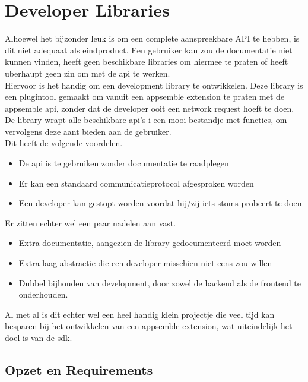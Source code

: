 \chapter{Developer Libraries}

Alhoewel het bijzonder leuk is om een complete aanspreekbare API te hebben, is dit niet adequaat als eindproduct. Een gebruiker kan zou de documentatie niet kunnen vinden, heeft geen beschikbare libraries om hiermee te praten of heeft uberhaupt geen zin om met de api te werken. \\

Hiervoor is het handig om een development library te ontwikkelen. Deze library is een plugintool gemaakt om vanuit een appsemble extension te praten met de appsemble api, zonder dat de developer ooit een network request hoeft te doen. De library wrapt alle beschikbare api's i een mooi bestandje met functies, om vervolgens deze aant bieden aan de gebruiker. \\ 

Dit heeft de volgende voordelen.

\begin{itemize}
	\item De api is te gebruiken zonder documentatie te raadplegen
	\item Er kan een standaard communicatieprotocol afgesproken worden
	\item Een developer kan gestopt worden voordat hij/zij iets stoms probeert te doen
\end{itemize}

Er zitten echter wel een paar nadelen aan vast.

\begin{itemize}
	\item Extra documentatie, aangezien de library gedocumenteerd moet worden
	\item Extra laag abstractie die een developer misschien niet eens zou willen
	\item Dubbel bijhouden van development, door zowel de backend als de frontend te onderhouden.
\end{itemize}

Al met al is dit echter wel een heel handig klein projectje die veel tijd kan besparen bij het ontwikkelen van een appsemble extension, wat uiteindelijk het doel is van de sdk. \\

\section{Opzet en Requirements}


